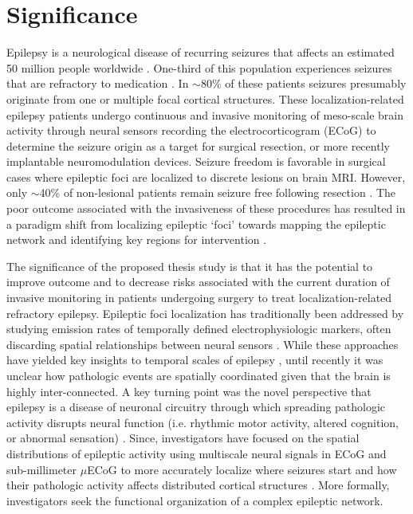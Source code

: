 \section*{Significance}
Epilepsy is a neurological disease of recurring seizures that affects an estimated 50 million people worldwide \cite{kwan2000early}. One-third of this population experiences seizures that are refractory to medication \cite{kwan2000early}. In $\sim$80\% of these patients seizures presumably originate from one or multiple focal cortical structures. These localization-related epilepsy patients undergo continuous and invasive monitoring of meso-scale brain activity through neural sensors recording the electrocorticogram (ECoG) to determine the seizure origin as a target for surgical resection, or more recently implantable neuromodulation devices. Seizure freedom is favorable in surgical cases where epileptic foci are localized to discrete lesions on brain MRI. However, only $\sim$40\% of non-lesional patients remain seizure free following resection \cite{french2007refractory}. The poor outcome associated with the invasiveness of these procedures has resulted in a paradigm shift from localizing epileptic `foci' towards mapping the epileptic network and identifying key regions for intervention \cite{spencer2002neural, kramer2012epilepsy, lehnertz2014evolving}.

The significance of the proposed thesis study is that it has the potential to improve outcome and to decrease risks associated with the current duration of invasive monitoring in patients undergoing surgery to treat localization-related refractory epilepsy. Epileptic foci localization has traditionally been addressed by studying emission rates of temporally defined electrophysiologic markers, often discarding spatial relationships between neural sensors . While these approaches have yielded key insights to temporal scales of epilepsy \cite{litt2001epileptic}, until recently it was unclear how pathologic events are spatially coordinated given that the brain is highly inter-connected. A key turning point was the novel perspective that epilepsy is a disease of neuronal circuitry through which spreading pathologic activity disrupts neural function (i.e. rhythmic motor activity, altered cognition, or abnormal sensation) \cite{spencer2002neural}. Since, investigators have focused on the spatial distributions of epileptic activity using multiscale neural signals in ECoG and sub-millimeter $\mu$ECoG to more accurately localize where seizures start and how their pathologic activity affects distributed cortical structures \cite{worrell2008high-frequency, schevon2009spatial, stead2010microseizures, viventi2011flexible, feldt_muldoon2013spatially, weiss2013ictal}. More formally, investigators seek the functional organization of a complex epileptic network.


